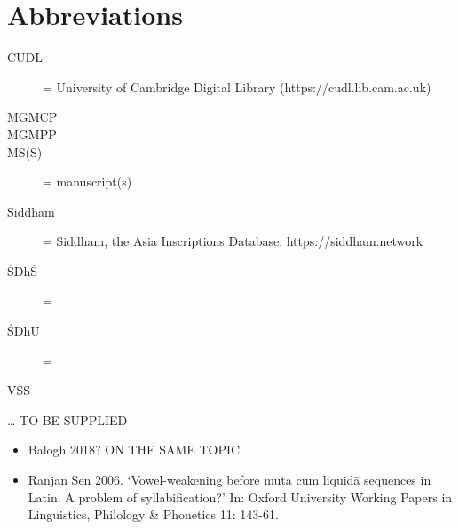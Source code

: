 \documentclass[11pt]{book}
\begin{document}
\section{Abbreviations}

\begin{description}

\item[CUDL] = University of Cambridge Digital Library  
  (https://cudl.lib.cam.ac.uk)
  
\item[\fol]

\item[\fols]

\item[MGMCP]

\item[MGMPP]

\item[MS(S)] = manuscript(s)

\item[Siddham] = Siddham, the Asia Inscriptions Database:
https://siddham.network 

\item[ŚDhŚ] = \SDhS

\item[ŚDhU] = \SDhU
  
\item[VSS] 
  
\end{description}




\ldots{} TO BE SUPPLIED




\begin{itemize}
\item
  Balogh 2018? ON THE SAME TOPIC
\item
  Ranjan Sen 2006. `Vowel-weakening before muta cum liquidā sequences in
  Latin. A problem of syllabification?' In: Oxford University Working
  Papers in Linguistics, Philology \& Phonetics 11: 143-61.
\end{itemize}




\vfill
\pagebreak
\end{document}
